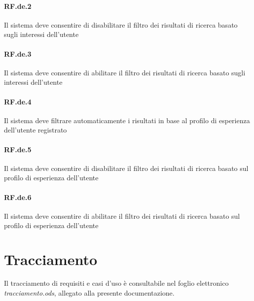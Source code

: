 \documentclass[10pt,a4paper,headinclude,footinclude,hidelinks]{scrreprt} %
\begin{document}
	\paragraph{RF.de.2} Il sistema deve consentire di disabilitare il filtro dei risultati di ricerca basato sugli interessi dell'utente

	\paragraph{RF.de.3} Il sistema deve consentire di abilitare il filtro dei risultati di ricerca basato sugli interessi dell'utente

	\paragraph{RF.de.4} Il sistema deve filtrare automaticamente i risultati in base al profilo di esperienza dell'utente registrato

	\paragraph{RF.de.5} Il sistema deve consentire di disabilitare il filtro dei risultati di ricerca basato sul profilo di esperienza dell'utente

	\paragraph{RF.de.6} Il sistema deve consentire di abilitare il filtro dei risultati di ricerca basato sul profilo di esperienza dell'utente

	\section{Tracciamento}
	\label{ch:stage:ar:requisiti:matrice}
	Il tracciamento di requisiti e casi d'uso è consultabile nel foglio elettronico \textit{tracciamento.ods}, allegato alla presente documentazione.
\end{document}
